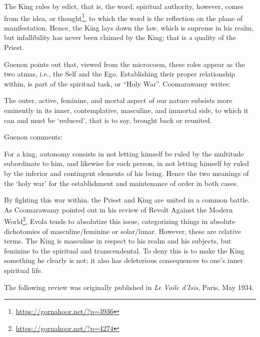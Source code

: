 The King rules by edict, that is, the word; spiritual authority, however, comes from the idea, or thought\footnote{\url{https://gornahoor.net/?p=3936}}, to which the word is the reflection on the plane of manifestation. Hence, the King lays down the law, which is supreme in his realm, but infallibility has never been claimed by the King; that is a quality of the Priest.

Guenon points out that, viewed from the microcosm, these roles appear as the two atmas, i.e., the Self and the Ego. Establishing their proper relationship within, is part of the spiritual task, or ``Holy War''. Coomarawamy writes:

\begin{quotex}
The outer, active, feminine, and mortal aspect of our nature subsists more eminently in its inner, contemplative, masculine, and immortal side, to which it can and must be `reduced', that is to say, brought back or reunited.
\end{quotex}


Guenon comments:

\begin{quotex}
For a king, autonomy consists in not letting himself be ruled by the multitude subordinate to him, and likewise for each person, in not letting himself by ruled by the inferior and contingent elements of his being. Hence the two meanings of the `holy war' for the establishment and maintenance of order in both cases.
\end{quotex}


By fighting this war within, the Priest and King are united in a common battle. As Coomarawamy pointed out in his review of Revolt Against the Modern World\footnote{\url{https://gornahoor.net/?p=4274}}, Evola tends to absolutize this issue, categorizing things in absolute dichotomies of masculine/feminine or solar/lunar. However, these are relative terms. The King is masculine in respect to his realm and his subjects, but feminine to the spiritual and transcendental. To deny this is to make the King something he clearly is not; it also has deleterious consequences to one's inner spiritual life.

The following review was originally published in \emph{Le Voile d'Isis}, Paris, May 1934.

